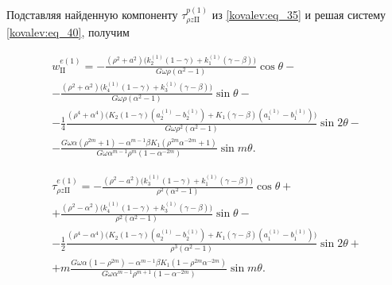 Подставляя найденную компоненту $\tau_{\rho z\mathrm{II}}^{p(1)}$ из \eqref{kovalev:eq_35} и решая систему \eqref{kovalev:eq_40}, получим

  \begin{multline}\label{kovalev:eq_41}

    w_{\mathrm{II}}^{e(1)}=-\frac{(\rho^2+a^2)\bigl(k_2^{(1)}(1-\gamma)+k_1^{(1)}(\gamma-\beta)\bigr)}{G\omega\rho(\alpha^2-1)}\cos\theta-\\

    -\frac{(\rho^2+\alpha^2)\bigl(k_4^{(1)}(1-\gamma)+k_3^{(1)}(\gamma-\beta)\bigr)}{G\omega\rho(\alpha^2-1)}\sin\theta-\\

    -\frac14\frac{(\rho^4+\alpha^4)\bigl(K_2(1-\gamma)(a_2^{(1)}-b_2^{(1)})+K_1(\gamma-\beta)(a_1^{(1)}-b_1^{(1)})\bigr)}{G\omega\rho^2(\alpha^2-1)}\sin2\theta-\\

    -\frac{G\omega\alpha(\rho^{2m}+1)-\alpha^{m-1}\beta K_1(\rho^{2m}\alpha^{-2m}+1)}{G\omega\alpha^{m-1}\rho^m(1-\alpha^{-2m})}\sin m\theta.

  \end{multline}

 \begin{multline}\label{kovalev:eq_42} 

    \tau_{\rho z\mathrm{II}}^{e(1)}=-\frac{(\rho^2-a^2)\bigl(k_3^{(1)}(1-\gamma)+k_1^{(1)}(\gamma-\beta)\bigr)}{\rho^2(\alpha^2-1)}\cos\theta+\\

    +\frac{(\rho^2-\alpha^2)\bigl(k_4^{(1)}(1-\gamma)+k_3^{(1)}(\gamma-\beta)\bigr)}{\rho^2(\alpha^2-1)}\sin\theta-\\

    -\frac12\frac{(\rho^4-\alpha^4)\bigl(K_2(1-\gamma)(a_2^{(1)}-b_2^{(1)})+K_1(\gamma-\beta)(a_1^{(1)}-b_1^{(1)})\bigr)}{\rho^3(\alpha^2-1)}\sin2\theta+\\

    +m\frac{G\omega\alpha(1-\rho^{2m})-\alpha^{m-1}\beta K_1(1-\rho^{2m}\alpha^{-2m})}{G\omega\alpha^{m-1}\rho^{m+1}(1-\alpha^{-2m})}\sin m\theta.

  \end{multline}

